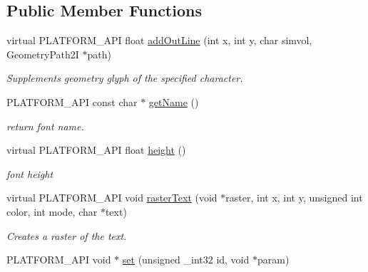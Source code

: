 \subsection*{Public Member Functions}
\begin{DoxyCompactItemize}
\item 
\hypertarget{classcsad_1_1_font_a9d553674c4a9ef79bed298d6ce317c14}{virtual P\-L\-A\-T\-F\-O\-R\-M\-\_\-\-A\-P\-I float \hyperlink{classcsad_1_1_font_a9d553674c4a9ef79bed298d6ce317c14}{add\-Out\-Line} (int x, int y, char simvol, Geometry\-Path2\-I $\ast$path)}\label{classcsad_1_1_font_a9d553674c4a9ef79bed298d6ce317c14}

\begin{DoxyCompactList}\small\item\em Supplements geometry glyph of the specified character. \end{DoxyCompactList}\item 
\hypertarget{classcsad_1_1_font_ad97cd895f6afe64be19c7a9a18742347}{P\-L\-A\-T\-F\-O\-R\-M\-\_\-\-A\-P\-I const char $\ast$ \hyperlink{classcsad_1_1_font_ad97cd895f6afe64be19c7a9a18742347}{get\-Name} ()}\label{classcsad_1_1_font_ad97cd895f6afe64be19c7a9a18742347}

\begin{DoxyCompactList}\small\item\em return font name. \end{DoxyCompactList}\item 
\hypertarget{classcsad_1_1_font_a2630256d9732a3b47b0526d17f5748d7}{virtual P\-L\-A\-T\-F\-O\-R\-M\-\_\-\-A\-P\-I float \hyperlink{classcsad_1_1_font_a2630256d9732a3b47b0526d17f5748d7}{height} ()}\label{classcsad_1_1_font_a2630256d9732a3b47b0526d17f5748d7}

\begin{DoxyCompactList}\small\item\em font height \end{DoxyCompactList}\item 
\hypertarget{classcsad_1_1_font_a17a01ec3279f4504bac8885a7437fdfc}{virtual P\-L\-A\-T\-F\-O\-R\-M\-\_\-\-A\-P\-I void \hyperlink{classcsad_1_1_font_a17a01ec3279f4504bac8885a7437fdfc}{raster\-Text} (void $\ast$raster, int x, int y, unsigned int color, int mode, char $\ast$text)}\label{classcsad_1_1_font_a17a01ec3279f4504bac8885a7437fdfc}

\begin{DoxyCompactList}\small\item\em Creates a raster of the text. \end{DoxyCompactList}\item 
\hypertarget{classcsad_1_1_font_a1e72b3d9af1d21f0c5042bfc6edec66f}{P\-L\-A\-T\-F\-O\-R\-M\-\_\-\-A\-P\-I void $\ast$ \hyperlink{classcsad_1_1_font_a1e72b3d9af1d21f0c5042bfc6edec66f}{set} (unsigned \-\_\-int32 id, void $\ast$param)}\label{classcsad_1_1_font_a1e72b3d9af1d21f0c5042bfc6edec66f}


\end{DoxyCompactItemize}
